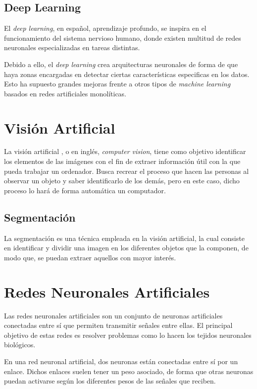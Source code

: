 \subsection{Deep Learning}
El \emph{deep learning}, en español, aprendizaje profundo, se inspira en el funcionamiento del sistema nervioso humano, donde existen multitud de redes neuronales especializadas en tareas distintas.

Debido a ello, el \emph{deep learning} crea arquitecturas neuronales de forma de que haya zonas encargadas en detectar ciertas características especificas en los datos. Esto ha supuesto grandes mejoras frente a otros tipos de \emph{machine learning} basados en redes artificiales monolíticas.

\section{Visión Artificial}
La visión artificial \cite{eswiki:141758410}, o en inglés, \emph{computer vision}, tiene como objetivo identificar los elementos de las imágenes con el fin de extraer información útil con la que pueda trabajar un ordenador. Busca recrear el proceso que hacen las personas al observar un objeto y saber identificarlo de los demás, pero en este caso, dicho proceso lo hará de forma automática un computador.

\subsection{Segmentación}
La segmentación \cite{palomino2009tecnicas} es una técnica empleada en la visión artificial, la cual consiste en identificar y dividir una imagen en los diferentes objetos que la componen, de modo que, se puedan extraer aquellos con mayor interés.

\section{Redes Neuronales Artificiales}
Las redes neuronales artificiales son un conjunto de neuronas artificiales conectadas entre sí que permiten transmitir señales entre ellas. El principal objetivo de estas redes es resolver problemas como lo hacen los tejidos neuronales biológicos.

En una red neuronal artificial, dos neuronas están conectadas entre sí por un enlace. Dichos enlaces suelen tener un peso asociado, de forma que otras neuronas puedan activarse según los diferentes pesos de las señales que reciben.

